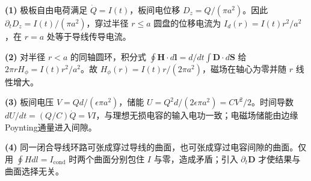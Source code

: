 \par\noindent\textbf{(1)} 极板自由电荷满足 \(\dot Q=I(t)\)，板间电位移 \(D_z=Q/(\pi a^2)\)。因此 \(\partial_tD_z=I(t)/(\pi a^2)\)，穿过半径 \(r\le a\) 圆盘的位移电流为 \(I_d(r)=I(t)r^2/a^2\)，在 \(r=a\) 处等于导线传导电流。
\par\noindent\textbf{(2)} 对半径 \(r<a\) 的同轴圆环，积分式 \(\oint\boldsymbol H\cdot d\boldsymbol l=d/dt\int\boldsymbol D\cdot d\boldsymbol S\) 给 \(2\pi rH_\phi=I(t)r^2/a^2\)。故 \(H_\phi(r)=I(t)r/(2\pi a^2)\)，磁场在轴心为零并随 \(r\) 线性增大。
\par\noindent\textbf{(3)} 板间电压 \(V=Qd/(\epsilon\pi a^2)\)，储能 \(U=Q^2d/(2\epsilon\pi a^2)=CV^2/2\)。时间导数 \(dU/dt=(Q/C)\dot Q=VI\)，与理想无损电容的输入电功一致；电磁场储能由边缘Poynting通量进入间隙。
\par\noindent\textbf{(4)} 同一闭合导线环路可张成穿过导线的曲面，也可张成穿过电容间隙的曲面。仅用 \(\oint Hdl=I_{\mathrm{cond}}\) 时两个曲面分别包住 \(I\) 与零，造成矛盾；引入 \(\partial_t\boldsymbol D\) 才使结果与曲面选择无关。
